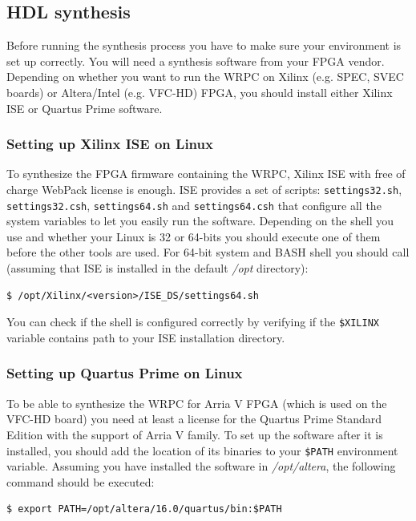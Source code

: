 \documentclass[a4paper, 12pt]{article}
\renewcommand{\_}{\underscore\allowbreak}
\begin{document}
\subsection{HDL synthesis}
\label{HDL synthesis}

Before running the synthesis process you have to make sure your environment is
set up correctly. You will need a synthesis software from your FPGA vendor.
Depending on whether you want to run the WRPC on Xilinx (e.g. SPEC, SVEC boards) or
Altera/Intel (e.g. VFC-HD) FPGA, you should install either Xilinx ISE or Quartus
Prime software.

\subsubsection{Setting up Xilinx ISE on Linux}
\label{Setting up Xilinx ISE}
To synthesize the FPGA firmware containing the WRPC, Xilinx ISE with free of
charge WebPack license is enough. ISE provides a set of scripts:
\texttt{settings32.sh}, \texttt{settings32.csh}, \texttt{settings64.sh} and
\texttt{settings64.csh} that configure all the system variables to let you
easily run the software. Depending on the shell you use and whether your Linux is
32 or 64-bits you should execute one of them before the other tools are used.
For 64-bit system and BASH shell you should call (assuming that ISE is installed
in the default \textit{/opt} directory):
\begin{lstlisting}
$ /opt/Xilinx/<version>/ISE_DS/settings64.sh
\end{lstlisting}

You can check if the shell is configured correctly by verifying if the
\texttt{\$XILINX} variable contains path to your ISE installation directory.

\subsubsection{Setting up Quartus Prime on Linux}
\label{Setting up Quartus Prime}
To be able to synthesize the WRPC for Arria V FPGA (which is used on the VFC-HD
board) you need at least a license for the Quartus Prime Standard Edition with
the support of Arria V family. To set up the software after it is installed, you
should add the location of its binaries to your \texttt{\$PATH} environment
variable. Assuming you have installed the software in \textit{/opt/altera}, the
following command should be executed:
\begin{lstlisting}
$ export PATH=/opt/altera/16.0/quartus/bin:$PATH
\end{lstlisting}
\end{document}
